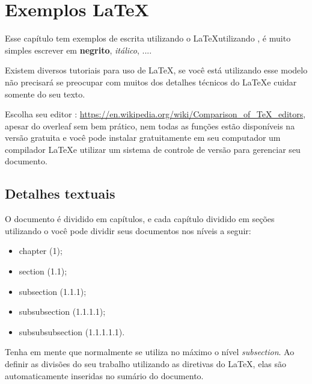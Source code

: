 \chapter{Exemplos \LaTeX}
\label{cap-exemplos}



Esse capítulo tem exemplos de escrita utilizando o \LaTeX  utilizando \abnTeX, é muito simples escrever em \textbf{negrito}, \emph{itálico}, ....


Existem diversos tutoriais para uso de \LaTeX, se você está utilizando esse modelo não precisará se preocupar com muitos dos detalhes técnicos do \LaTeX \space e cuidar somente do seu texto.

Escolha seu editor : \url{https://en.wikipedia.org/wiki/Comparison\_of\_TeX\_editors}, apesar do overleaf sem bem prático, nem todas as funções estão disponíveis na versão gratuita e você pode instalar gratuitamente em seu computador um compilador \LaTeX \space e utilizar um sistema de controle de versão para gerenciar seu documento.




\section{Detalhes textuais}

O documento é dividido em capítulos, e cada capítulo dividido em seções utilizando o \abnTeX \space você pode dividir seus documentos nos níveis a seguir:

\begin{itemize}
\item chapter (1);
\item section (1.1);
\item subsection (1.1.1);
\item subsubsection (1.1.1.1);
\item subsubsubsection (1.1.1.1.1).
\end{itemize}

Tenha em mente que normalmente se utiliza no máximo o nível \emph{subsection}.
Ao definir as divisões do seu trabalho utilizando as diretivas do \LaTeX, elas são automaticamente inseridas no sumário do documento.


